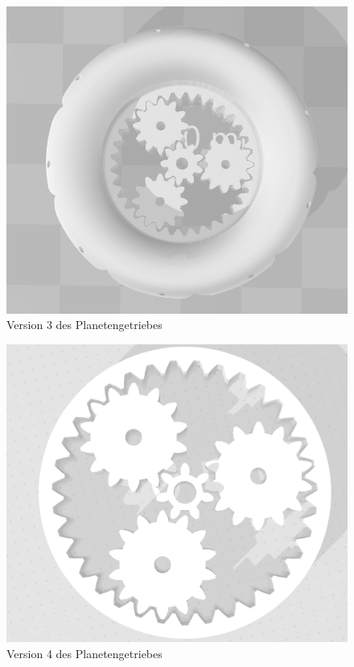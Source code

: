\begin{figure}[!ht]
	\centering
	\includegraphics[width=\textwidth]{bilder/GetriebeVersion3-2.png}
	\caption{Version 3 des Planetengetriebes}
	\label{bild:gearversion3-2}
\end{figure}
\begin{figure}[!ht]
	\centering
	\includegraphics[width=\textwidth]{bilder/GetriebeVersion4-1.png}
	\caption{Version 4 des Planetengetriebes}
	\label{bild:gearversion4-1}
\end{figure}
